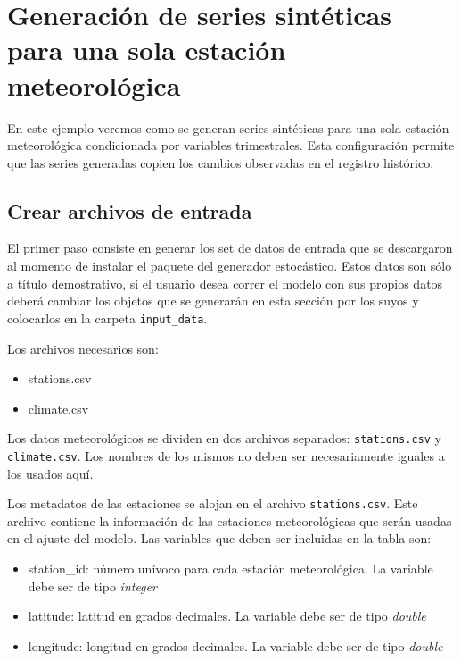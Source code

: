 \documentclass[
]{article}
\providecommand{\tightlist}{%
  \setlength{\itemsep}{0pt}\setlength{\parskip}{0pt}}
\begin{document}
\hypertarget{generaciuxf3n-de-series-sintuxe9ticas-para-una-sola-estaciuxf3n-meteoroluxf3gica}{%
\section{Generación de series sintéticas para una sola estación meteorológica}\label{generaciuxf3n-de-series-sintuxe9ticas-para-una-sola-estaciuxf3n-meteoroluxf3gica}}

En este ejemplo veremos como se generan series sintéticas para una sola estación meteorológica condicionada por variables trimestrales. Esta configuración permite que las series generadas copien los cambios observadas en el registro histórico.

\hypertarget{crear-archivos-de-entrada}{%
\subsection{Crear archivos de entrada}\label{crear-archivos-de-entrada}}

El primer paso consiste en generar los set de datos de entrada que se descargaron al momento de instalar el paquete del generador estocástico. Estos datos son sólo a título demostrativo, si el usuario desea correr el modelo con sus propios datos deberá cambiar los objetos que se generarán en esta sección por los suyos y colocarlos en la carpeta \texttt{input\_data}.

Los archivos necesarios son:

\begin{itemize}
\tightlist
\item
  stations.csv
\item
  climate.csv
\end{itemize}

Los datos meteorológicos se dividen en dos archivos separados: \texttt{stations.csv} y \texttt{climate.csv}. Los nombres de los mismos no deben ser necesariamente iguales a los usados aquí.

Los metadatos de las estaciones se alojan en el archivo \texttt{stations.csv}. Este archivo contiene la información de las estaciones meteorológicas que serán usadas en el ajuste del modelo. Las variables que deben ser incluidas en la tabla son:

\begin{itemize}
\tightlist
\item
  station\_id: número unívoco para cada estación meteorológica. La variable debe ser de tipo \emph{integer}
\item
  latitude: latitud en grados decimales. La variable debe ser de tipo \emph{double}
\item
  longitude: longitud en grados decimales. La variable debe ser de tipo \emph{double}
\end{itemize}
\end{document}
